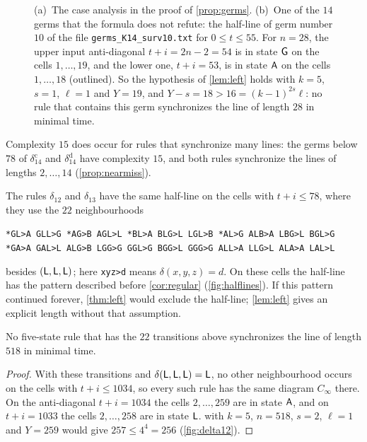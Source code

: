 \begin{figure}[t]
\centering

\caption{(a)~The case analysis in the proof of \cref{prop:germs}. (b)~One of
the $14$ germs that the formula does not refute: the half-line of germ number
$10$ of the file \texttt{germs\_K14\_surv10.txt} for $0\le t\le55$. For $n=28$,
the upper input anti-diagonal $t+i=2n-2=54$ is in state $\mathsf G$ on the cells
$1,\dots,19$, and the lower one, $t+i=53$, is in state $\mathsf A$ on the cells
$1,\dots,18$ (outlined). So the hypothesis of \cref{lem:left} holds with $k=5$,
$s=1$, $\ell=1$ and $Y=19$, and $Y-s=18>16=(k-1)^{2s}\ell$: no rule that
contains this germ synchronizes the line of length $28$ in minimal time.}
\label{fig:germs}
\end{figure}

Complexity $15$ does occur for rules that synchronize many lines: the germs
below $78$ of $\delta_{14}^{\mathrm c}$ and $\delta_{14}^{\mathrm d}$ have
complexity $15$, and both rules synchronize the lines of lengths $2,\dots,14$
(\cref{prop:nearmiss}).

The rules $\delta_{12}$ and $\delta_{13}$ have the same half-line on the cells
with $t+i\le78$, where they use the $22$ neighbourhoods
\begin{center}\small
\texttt{*GL>A GLL>G *AG>B AGL>L *BL>A BLG>L LGL>B *AL>G ALB>A LBG>L BGL>G}\\
\texttt{*GA>A GAL>L ALG>B LGG>G GGL>G BGG>L GGG>G ALL>A LLG>L ALA>A LAL>L}
\end{center}
besides $(\mathsf L,\mathsf L,\mathsf L)$; here \texttt{xyz>d} means $\delta(x,y,z)=d$. On these
cells the half-line has the pattern described before \cref{cor:regular}
(\cref{fig:halflines}). If this pattern continued forever, \cref{thm:left}
would exclude the half-line; \cref{lem:left} gives an explicit length without
that assumption.

\begin{corollary}\label{cor:germ12}
No five-state rule that has the $22$ transitions above synchronizes the line of
length $518$ in minimal time.
\end{corollary}

\begin{proof}
With these transitions and $\delta(\mathsf L,\mathsf L,\mathsf L)=\mathsf L$, no other neighbourhood
occurs on the cells with $t+i\le1034$, so every such rule has the same diagram
$C_\infty$ there. On the anti-diagonal $t+i=1034$ the cells $2,\dots,259$ are in
state $\mathsf A$, and on $t+i=1033$ the cells $2,\dots,258$ are in state $\mathsf L$.
 with $k=5$, $n=518$, $s=2$, $\ell=1$ and $Y=259$ would give
$257\le4^4=256$ (\cref{fig:delta12}).
\end{proof}

